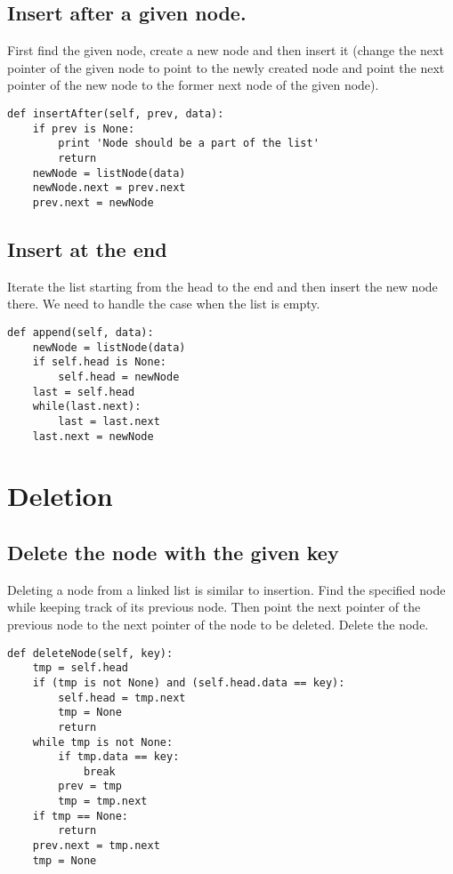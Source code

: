 \subsection{Insert after a given node.}
First find the given node, create a new node and then insert it (change the next pointer of the given node to point to the newly created node and point the next pointer of the new node to the former next node of the given node).
\begin{lstlisting}
def insertAfter(self, prev, data):
    if prev is None:
        print 'Node should be a part of the list'
        return
    newNode = listNode(data)
    newNode.next = prev.next
    prev.next = newNode
\end{lstlisting}

\subsection{Insert at the end}
Iterate the list starting from the head to the end and then insert the new node there. We need to handle the case when the list is empty.
\begin{lstlisting}
def append(self, data):
    newNode = listNode(data)
    if self.head is None:
        self.head = newNode
    last = self.head
    while(last.next):
        last = last.next
    last.next = newNode
\end{lstlisting}

\section{Deletion}
\subsection{Delete the node with the given key}
Deleting a node from a linked list is similar to insertion. Find the specified node while keeping track of its previous node. Then point the next pointer of the previous node to the next pointer of the node to be deleted. Delete the node. 
\begin{lstlisting}
def deleteNode(self, key):
    tmp = self.head
    if (tmp is not None) and (self.head.data == key):
        self.head = tmp.next
        tmp = None
        return
    while tmp is not None:
        if tmp.data == key:
            break
        prev = tmp
        tmp = tmp.next
    if tmp == None:
        return
    prev.next = tmp.next
    tmp = None
\end{lstlisting}

